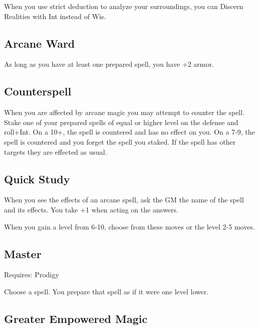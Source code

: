 When you use strict deduction to analyze your surroundings, you can Discern Realities with Int instead of Wis.

         
\subsection{Arcane Ward}    
         

As long as you have at least one prepared spell, you have +2 armor.

         
\subsection{Counterspell}   
         

When you are affected by arcane magic you may attempt to counter the spell. Stake one of your prepared spells of equal or higher level on the defense and roll+Int. On a 10+, the spell is countered and has no effect on you. On a 7-9, the spell is countered and you forget the spell you staked. If the spell has other targets they are effected as usual.

         
\subsection{Quick Study}    
         

When you see the effects of an arcane spell, ask the GM the name of the spell and its effects. You take +1 when acting on the answers.

         
\startInstructions
When you gain a level from 6-10, choose from these moves or the level 2-5 moves.
\stopInstructions
         
\subsection{Master}   
         

Requires: Prodigy

         

Choose a spell. You prepare that spell as if it were one level lower.

         
\subsection{Greater Empowered Magic}     
         

